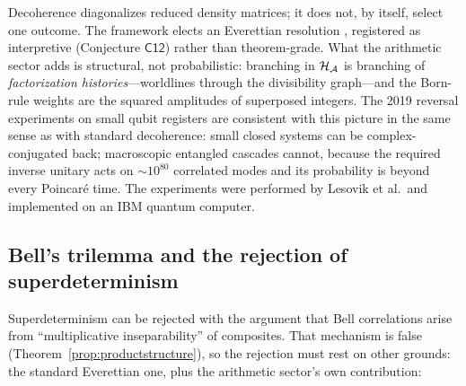 \begin{remark}
Decoherence diagonalizes reduced density matrices; it does not, by itself, select one
outcome. The framework elects an Everettian resolution
\cite{wallace2012}, registered as interpretive
(Conjecture $\mathsf{C12}$) rather than theorem-grade. What the arithmetic sector adds is
structural, not probabilistic: branching in $\mathcal{H}_{\mathcal{A}}$ is branching of
\emph{factorization histories}---worldlines through the divisibility graph---and the
Born-rule weights are the squared amplitudes of superposed integers. The 2019 reversal
experiments on small qubit registers \cite{lesovik2019} are consistent with this picture in
the same sense as with standard decoherence: small closed systems can be
complex-conjugated back; macroscopic entangled cascades cannot, because the required
inverse unitary acts on $\sim10^{80}$ correlated modes and its probability is beyond every
Poincar\'e time. The experiments were performed by Lesovik et al.\ and implemented on an IBM
quantum computer.
\end{remark}

\subsection{Bell's trilemma and the rejection of superdeterminism}

Superdeterminism can be rejected with the argument that Bell correlations arise from
``multiplicative inseparability'' of composites. That mechanism is false
(Theorem~\ref{prop:productstructure}), so the rejection must rest on other grounds: the standard
Everettian one, plus the arithmetic sector's own contribution:

